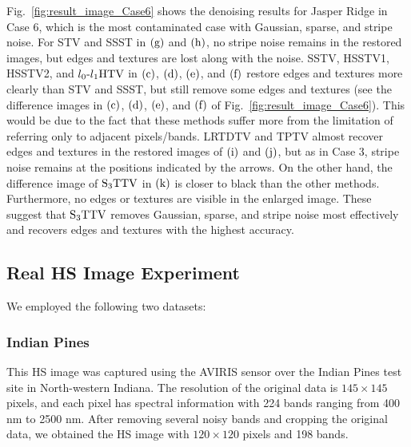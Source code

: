 \documentclass[10pt,journal]{IEEEtran}
\begin{document}
Fig.~\ref{fig:result_image_Case6} shows the denoising results for Jasper Ridge in Case 6, which is the most contaminated case with Gaussian, sparse, and stripe noise.
For STV and SSST in $\text{(g)}$ and $\text{(h)}$, no stripe noise remains in the restored images, but edges and textures are lost along with the noise.
SSTV, HSSTV1, HSSTV2, and ${l_{0}\text{-}l_{1}\text{HTV}}$ in $\text{(c)}$, $\text{(d)}$, $\text{(e)}$, and $\text{(f)}$ restore edges and textures more clearly than STV and SSST, but still remove some edges and textures (see the difference images in $\text{(c)}$, $\text{(d)}$, $\text{(e)}$, and $\text{(f)}$ of Fig.~\ref{fig:result_image_Case6}).
This would be due to the fact that these methods suffer more from the limitation of referring only to adjacent pixels/bands.
LRTDTV and TPTV almost recover edges and textures in the restored images of $\text{(i)}$ and $\text{(j)}$, but as in Case 3, stripe noise remains at the positions indicated by the arrows.
On the other hand, the difference image of ${\text{S}_{3} \text{TTV}}$ in $\text{(k)}$ is closer to black than the other methods.
Furthermore, no edges or textures are visible in the enlarged image.
These suggest that ${\text{S}_{3} \text{TTV}}$ removes Gaussian, sparse, and stripe noise most effectively and recovers edges and textures with the highest accuracy.

\subsection{Real HS Image Experiment}
\label{subsec:RealHSIExpt}


We employed the following two datasets:
\subsubsection{Indian Pines}  This HS image was captured using the AVIRIS sensor over the Indian Pines test site in North-western Indiana.
The resolution of the original data is $145 \times 145$ pixels, and each pixel has spectral information with 224 bands ranging from 400 nm to 2500 nm.
After removing several noisy bands and cropping the original data, we obtained the HS image with $120 \times 120$ pixels and 198 bands.
\end{document}
